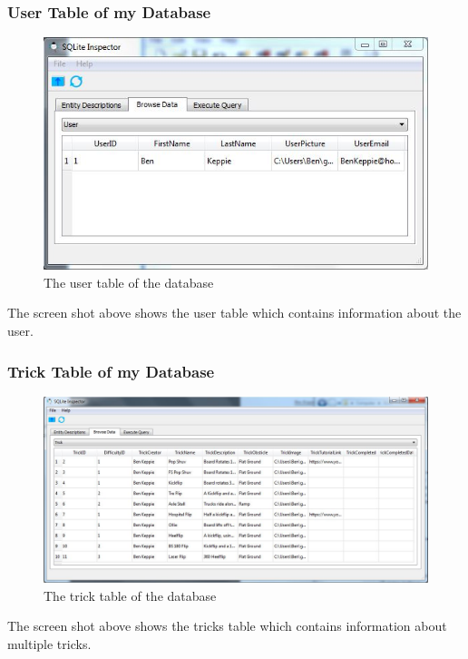 \subsubsection{User Table of my Database}
\begin{figure}[H]
    \includegraphics[width=\textwidth]{./Maintenance/Figures/UserTable.jpg}
    \caption{The user table of the database} \label{fig:User Table}
\end{figure}

The screen shot above shows the user table which contains information about the user.


\subsubsection{Trick Table of my Database}
\begin{figure}[H]
    \includegraphics[width=\textwidth]{./Maintenance/Figures/TrickTable.jpg}
    \caption{The trick table of the database} \label{fig:Trick Table}
\end{figure}

The screen shot above shows the tricks table which contains information about multiple tricks.


